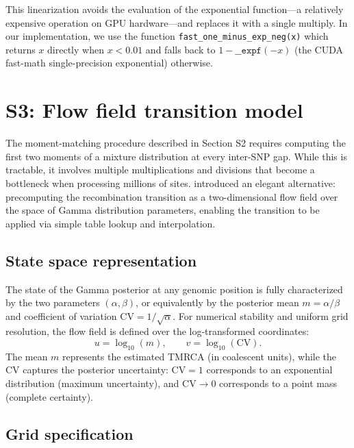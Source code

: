 \documentclass[10pt,letterpaper]{article}
\begin{document}
This linearization avoids the evaluation of the exponential function---a relatively expensive operation on GPU hardware---and replaces it with a single multiply. In our implementation, we use the function \texttt{fast\_one\_minus\_exp\_neg(x)} which returns $x$ directly when $x < 0.01$ and falls back to $1 - \texttt{\_\_expf}(-x)$ (the CUDA fast-math single-precision exponential) otherwise.


\section{S3: Flow field transition model}

The moment-matching procedure described in Section S2 requires computing the first two moments of a mixture distribution at every inter-SNP gap. While this is tractable, it involves multiple multiplications and divisions that become a bottleneck when processing millions of sites. \citet{Schweiger2023} introduced an elegant alternative: precomputing the recombination transition as a two-dimensional flow field over the space of Gamma distribution parameters, enabling the transition to be applied via simple table lookup and interpolation.

\subsection{State space representation}

The state of the Gamma posterior at any genomic position is fully characterized by the two parameters $(\alpha, \beta)$, or equivalently by the posterior mean $m = \alpha/\beta$ and coefficient of variation $\mathrm{CV} = 1/\sqrt{\alpha}$. For numerical stability and uniform grid resolution, the flow field is defined over the log-transformed coordinates:
\begin{equation}
u = \log_{10}(m), \qquad v = \log_{10}(\mathrm{CV}).
\end{equation}
The mean $m$ represents the estimated TMRCA (in coalescent units), while the CV captures the posterior uncertainty: $\mathrm{CV} = 1$ corresponds to an exponential distribution (maximum uncertainty), and $\mathrm{CV} \to 0$ corresponds to a point mass (complete certainty).

\subsection{Grid specification}
\end{document}
